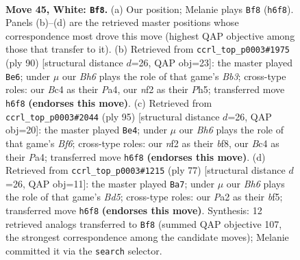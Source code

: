 \documentclass[11pt]{article}
\begin{document}
\clearpage

\begin{figure}[p]\centering
\begin{subfigure}{0.46\textwidth}\centering
\resizebox{\linewidth}{!}{%
\newchessgame
\chessboard[
  setfen={6R1/pb1p3r/7B/5k2/2B5/8/PPK2n2/8 w - - 10 45},
  showmover=false,
  pgfstyle=straightmove, color=movearrow, markmove={h6-f8}
]}
\caption{}
\end{subfigure}\hfill
\begin{subfigure}{0.46\textwidth}\centering
\resizebox{\linewidth}{!}{%
\newchessgame
\chessboard[
  setfen={5k2/p1n3p1/1p6/7P/P4PK1/1Br5/8/4R3 w - - 7 46},
  showmover=false,
  pgfstyle=straightmove, color=movearrow, markmove={b3-e6}
]}
\caption{}
\end{subfigure}
\\[4pt]
\begin{subfigure}{0.46\textwidth}\centering
\resizebox{\linewidth}{!}{%
\newchessgame
\chessboard[
  setfen={5B2/8/8/1k5p/p7/P4bRP/4r3/6K1 b - - 1 48},
  showmover=false,
  pgfstyle=straightmove, color=movearrow, markmove={f3-e4}
]}
\caption{}
\end{subfigure}\hfill
\begin{subfigure}{0.46\textwidth}\centering
\resizebox{\linewidth}{!}{%
\newchessgame
\chessboard[
  setfen={6k1/5p2/3R4/5B2/2Pb4/8/4P1K1/r7 b - - 2 39},
  showmover=false,
  pgfstyle=straightmove, color=movearrow, markmove={d4-a7}
]}
\caption{}
\end{subfigure}
\caption{\textbf{Move 45, White: \texttt{Bf8}.} (a) Our position; Melanie plays \texttt{Bf8} (\texttt{h6f8}). Panels (b)--(d) are the retrieved master positions whose correspondence most drove this move (highest QAP objective among those that transfer to it). (b) Retrieved from \texttt{ccrl\_top\_p0003\#1975} (ply 90) [structural distance $d$=26, QAP obj=23]: the master played \texttt{Be6}; under $\mu$ our \emph{Bh6} plays the role of that game's \emph{Bb3}; cross-type roles: our \emph{B}c4 as their \emph{P}a4, our \emph{n}f2 as their \emph{P}h5; transferred move \texttt{h6f8} \textbf{(endorses this move)}. (c) Retrieved from \texttt{ccrl\_top\_p0003\#2044} (ply 95) [structural distance $d$=26, QAP obj=20]: the master played \texttt{Be4}; under $\mu$ our \emph{Bh6} plays the role of that game's \emph{Bf6}; cross-type roles: our \emph{n}f2 as their \emph{b}f8, our \emph{B}c4 as their \emph{P}a4; transferred move \texttt{h6f8} \textbf{(endorses this move)}. (d) Retrieved from \texttt{ccrl\_top\_p0003\#1215} (ply 77) [structural distance $d$=26, QAP obj=11]: the master played \texttt{Ba7}; under $\mu$ our \emph{Bh6} plays the role of that game's \emph{Bd5}; cross-type roles: our \emph{P}a2 as their \emph{b}f5; transferred move \texttt{h6f8} \textbf{(endorses this move)}. Synthesis: 12 retrieved analogs transferred to \texttt{Bf8} (summed QAP objective 107, the strongest correspondence among the candidate moves); Melanie committed it via the \texttt{search} selector.}
\label{fig:thought-m88}
\end{figure}
\end{document}

